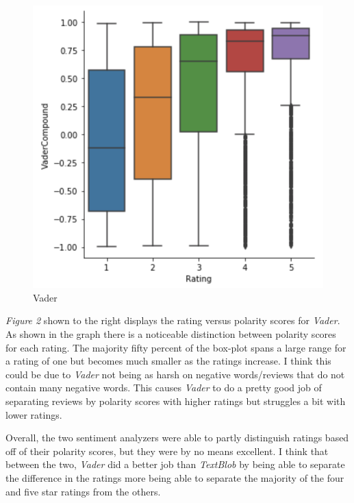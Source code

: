 \documentclass[a4paper, 11pt]{article}
\begin{document}
\begin{figure} %
    \vspace{-3mm}
    \centering
    \caption{Vader}
    \includegraphics[width=\linewidth, trim=1 -35 1 -20,clip]{SentimentVader.png}
    \vspace{-20mm}
\end{figure}


\noindent
\emph{Figure 2} shown to the right displays the rating versus polarity scores for \emph{Vader}. As shown in the graph there is a noticeable distinction between polarity scores for each rating. The majority fifty percent of the box-plot spans a large range for a rating of one but becomes much smaller as the ratings increase. I think this could be due to \emph{Vader} not being as harsh on negative words/reviews that do not contain many negative words. This causes \emph{Vader} to do a pretty good job of separating reviews by polarity scores with higher ratings but struggles a bit with lower ratings.

\noindent
Overall, the two sentiment analyzers were able to partly distinguish ratings based off of their polarity scores, but they were by no means excellent. I think that between the two, \emph{Vader} did a better job than \emph{TextBlob} by being able to separate the difference in the ratings more being able to separate the majority of the four and five star ratings from the others.
\end{document}
